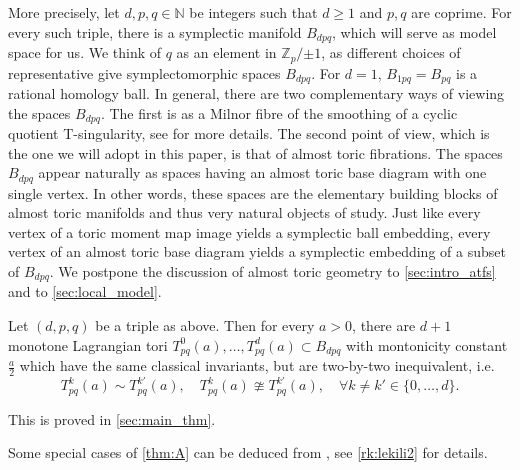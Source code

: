 \documentclass[12pt,a4paper,abstract=true,draft]{scrartcl}
\begin{document}
More precisely, let $d,p,q \in \mathbb{N}$ be integers such that $d≥1$ and $p,q$ are coprime.
For every such triple, there is a symplectic manifold $B_{dpq}$, which will serve as model space for us. 
We think of $q$ as an element in $ℤ_p / {±1}$, as different choices of representative give symplectomorphic spaces $B_{dpq}$.
For $d=1$, $B_{1pq} = B_{pq}$ is a rational homology ball.
In general, there are two complementary ways of viewing the spaces $B_{dpq}$.
The first is as a Milnor fibre of the smoothing of a cyclic quotient T-singularity, see \cite[Section 7.4]{evans2021atfs} for more details.
The second point of view, which is the one we will adopt in this paper, is that of almost toric fibrations.
The spaces $B_{dpq}$ appear naturally as spaces having an almost toric base diagram with one single vertex.
In other words, these spaces are the elementary building blocks of almost toric manifolds and thus very natural objects of study.
Just like every vertex of a toric moment map image yields a symplectic ball embedding, every vertex of an almost toric base diagram yields a symplectic embedding of a subset of $B_{dpq}$.
We postpone the discussion of almost toric geometry to \cref{sec:intro_atfs} and to \cref{sec:local_model}. 

\begin{maintheorem}
    \label{thm:A}
    Let $(d,p,q)$ be a triple as above.
Then for every $a>0$, there are $d+1$ monotone Lagrangian tori $T^0_{pq}(a), \ldots , T^d_{pq}(a) \subset B_{dpq}$ with montonicity constant $\frac{a}{2}$ which have the same classical invariants, but are two-by-two inequivalent, i.e.\ 
    \begin{equation}
        T^k_{pq}(a) \sim T^{k'}_{pq}(a), \quad 
         T^k_{pq}(a) \ncong T^{k'}_{pq}(a), \quad
        \forall k \neq k' \in \{0,\ldots,d\}.
    \end{equation}
\end{maintheorem}

This is proved in \cref{sec:main_thm}.

\begin{remark}
    \label{rk:lekili}
    Some special cases of \cref{thm:A} can be deduced from \cite{LekMay14}, see \cref{rk:lekili2} for details.
\end{remark}
\end{document}
